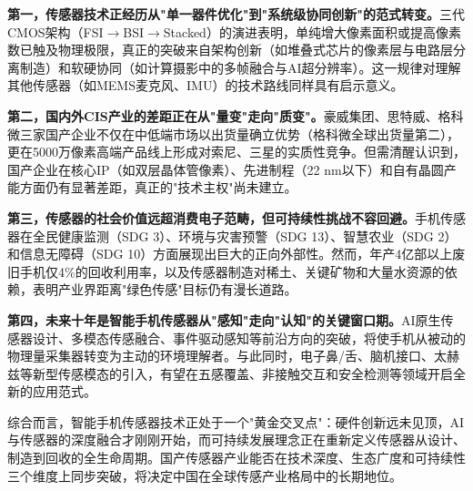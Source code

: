 \documentclass[12pt, a4paper]{ctexart}
\begin{document}
\textbf{第一，传感器技术正经历从"单一器件优化"到"系统级协同创新"的范式转变。}三代CMOS架构（FSI$\to$BSI$\to$Stacked）的演进表明，单纯增大像素面积或提高像素数已触及物理极限，真正的突破来自架构创新（如堆叠式芯片的像素层与电路层分离制造）和软硬协同（如计算摄影中的多帧融合与AI超分辨率）。这一规律对理解其他传感器（如MEMS麦克风、IMU）的技术路线同样具有启示意义。

\textbf{第二，国内外CIS产业的差距正在从"量变"走向"质变"。}豪威集团、思特威、格科微三家国产企业不仅在中低端市场以出货量确立优势（格科微全球出货量第二），更在5000万像素高端产品线上形成对索尼、三星的实质性竞争。但需清醒认识到，国产企业在核心IP（如双层晶体管像素）、先进制程（22 nm以下）和自有晶圆产能方面仍有显著差距，真正的"技术主权"尚未建立。

\textbf{第三，传感器的社会价值远超消费电子范畴，但可持续性挑战不容回避。}手机传感器在全民健康监测（SDG 3）、环境与灾害预警（SDG 13）、智慧农业（SDG 2）和信息无障碍（SDG 10）方面展现出巨大的正向外部性。然而，年产4亿部以上废旧手机仅4\%的回收利用率，以及传感器制造对稀土、关键矿物和大量水资源的依赖，表明产业界距离"绿色传感"目标仍有漫长道路。

\textbf{第四，未来十年是智能手机传感器从"感知"走向"认知"的关键窗口期。}AI原生传感器设计、多模态传感融合、事件驱动感知等前沿方向的突破，将使手机从被动的物理量采集器转变为主动的环境理解者。与此同时，电子鼻/舌、脑机接口、太赫兹等新型传感模态的引入，有望在五感覆盖、非接触交互和安全检测等领域开启全新的应用范式。

综合而言，智能手机传感器技术正处于一个"黄金交叉点"：硬件创新远未见顶，AI与传感器的深度融合才刚刚开始，而可持续发展理念正在重新定义传感器从设计、制造到回收的全生命周期。国产传感器产业能否在技术深度、生态广度和可持续性三个维度上同步突破，将决定中国在全球传感产业格局中的长期地位。
\end{document}
